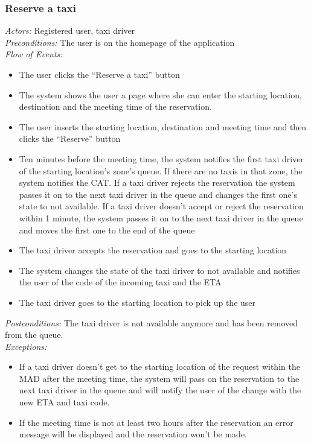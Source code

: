 \documentclass{article}
\begin{document}
\subsubsection{Reserve a taxi}
\textit{Actors:} Registered user, taxi driver
\\\textit{Preconditions:} The user is on the homepage of the application 
\\\textit{Flow of Events:}
\begin{itemize}
	\item  The user clicks the ``Reserve a taxi'' button
	\item  The system shows the user a page where she can enter the starting location, destination and the meeting time of the reservation.
	\item  The user inserts the starting location, destination and meeting time and then clicks the ``Reserve'' button
	\item  Ten minutes before the meeting time, the system notifies the first taxi driver of the starting location's zone's queue. If there are no taxis in that zone, the system notifies the CAT\@. If a taxi driver rejects the reservation the system passes it on to the next taxi driver in the queue and changes the first one's state to not available. If a taxi driver doesn't accept or reject the reservation within 1 minute, the system passes it on to the next taxi driver in the queue and moves the first one to the end of the queue
	\item  The taxi driver accepts the reservation and goes to the starting location
	\item  The system changes the state of the taxi driver to not available and notifies the user of the code of the incoming taxi and the ETA
	\item  The taxi driver goes to the starting location to pick up the user
\end{itemize}
\textit{Postconditions:} The taxi driver is not available anymore and has been removed from the queue.
\\\textit{Exceptions:}
\begin{itemize}
	\item If a taxi driver doesn't get to the starting location of the request within the MAD after the meeting time, the system will pass on the reservation to the next taxi driver in the queue and will notify the user of the change with the new ETA and taxi code.
	\item If the meeting time is not at least two hours after the reservation an error message will be displayed and the reservation won't be made.
\end{itemize}
\end{document}
